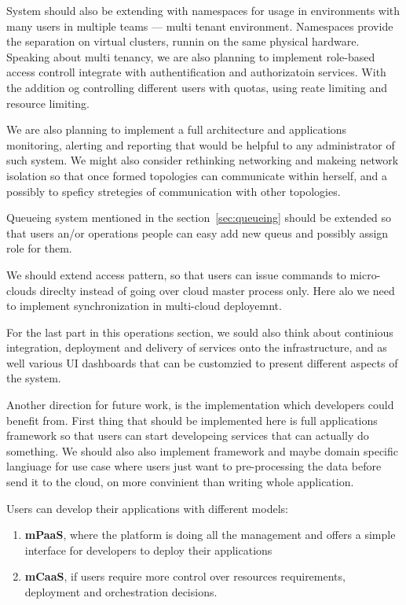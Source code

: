 System should also be extending with namespaces for usage in environments with many users in multiple teams --- multi tenant environment. Namespaces provide the separation on virtual clusters, runnin on the same physical hardware. Speaking about multi tenancy, we are also planning to implement role-based access controll integrate with authentification and authorizatoin services. With the addition og controlling different users with quotas, using reate limiting and resource limiting.

We are also planning to implement a full architecture and applications monitoring, alerting and reporting that would be helpful to any administrator of such system. We might also consider rethinking networking and makeing network isolation so that once formed topologies can communicate within herself, and a possibly to speficy 
stretegies of communication with other topologies.

Queueing system mentioned in the section~\ref{sec:queueing} should be extended so that users an/or operations people can easy add new queus and possibly assign role for them.
 
 We should extend access pattern, so that users can issue commands to micro-clouds direclty instead of going over cloud master process only. Here alo we need to implement synchronization in multi-cloud deployemnt.
 
For the last part in this operations section, we sould also think about continious integration, deployment and delivery of services onto the infrastructure, and as well various UI dashboards that can be customzied to present different aspects of the system.

Another direction for future work, is the implementation which developers could benefit from. First thing that should be implemented here is full applications framework so that users can start developeing services that can actually do something. We should also also implement framework and maybe domain specific langiuage for use case where users just want to pre-processing the data before send it to the cloud, on more convinient than writing whole application.

Users can develop their applications with different models: 

\begin{enumerate}[start=1,label={(\bfseries \arabic*)}]
	\item \textbf{mPaaS}, where the platform is doing all the management and offers a simple interface for developers to deploy their applications
	\item \textbf{mCaaS}, if users require more control over resources requirements, deployment and orchestration decisions.
\end{enumerate}

